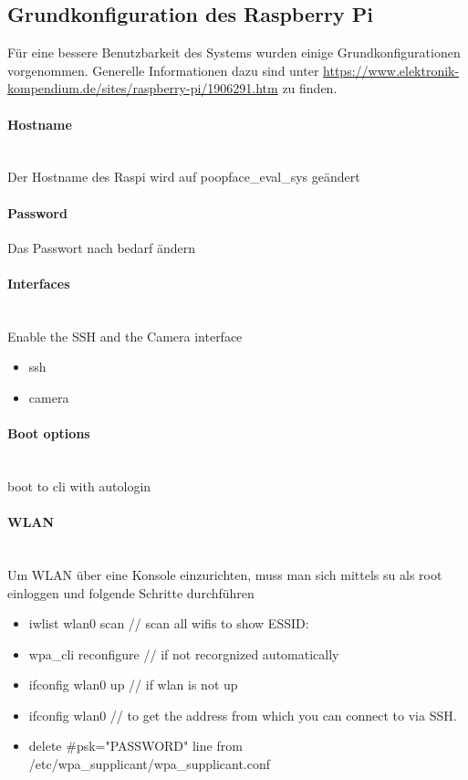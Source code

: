 \subsection{Grundkonfiguration des Raspberry Pi}

Für eine bessere Benutzbarkeit des Systems wurden einige Grundkonfigurationen vorgenommen. Generelle Informationen dazu sind unter \url{https://www.elektronik-kompendium.de/sites/raspberry-pi/1906291.htm} zu finden.

\paragraph{Hostname} \hspace{0pt} \\
Der Hostname des Raspi wird auf poopface\_eval\_sys geändert
\paragraph{Password}
Das Passwort nach bedarf ändern %
\paragraph{Interfaces} \hspace{0pt} \\
Enable the SSH and the Camera interface
\begin{itemize}
  \item ssh
  \item camera
\end{itemize}

\paragraph{Boot options} \hspace{0pt} \\
boot to cli with autologin

\paragraph{WLAN} \hspace{0pt}\\
Um WLAN über eine Konsole einzurichten, muss man sich mittels su als root einloggen und folgende Schritte durchführen

\begin{itemize}
  \item iwlist wlan0 scan // scan all wifis to show ESSID:
  \item wpa\_cli reconfigure // if not recorgnized automatically
  \item ifconfig wlan0 up // if wlan is not up
  \item ifconfig wlan0 // to get the address from which you can connect to via SSH.
  \item delete \#psk="PASSWORD" line from /etc/wpa\_supplicant/wpa\_supplicant.conf
\end{itemize}

